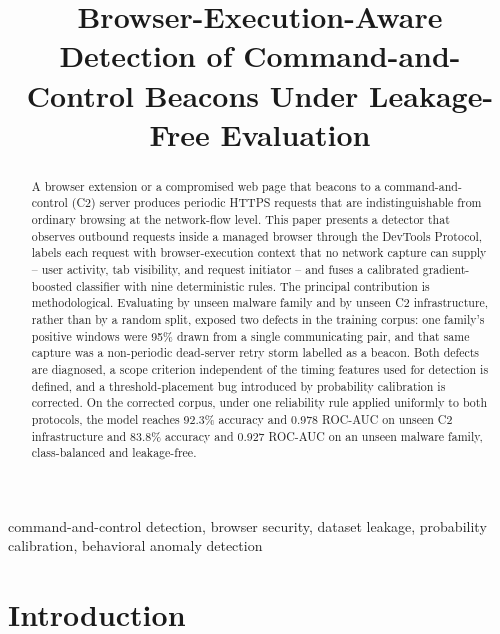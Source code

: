 \documentclass[conference,a4paper]{IEEEtran}
\begin{document}
\title{Browser-Execution-Aware Detection of Command-and-Control Beacons Under Leakage-Free Evaluation}

\author{
}

\maketitle

\begin{abstract}
A browser extension or a compromised web page that beacons to a command-and-control (C2) server produces periodic HTTPS requests that are indistinguishable from ordinary browsing at the network-flow level. This paper presents a detector that observes outbound requests inside a managed browser through the DevTools Protocol, labels each request with browser-execution context that no network capture can supply -- user activity, tab visibility, and request initiator -- and fuses a calibrated gradient-boosted classifier with nine deterministic rules. The principal contribution is methodological. Evaluating by unseen malware family and by unseen C2 infrastructure, rather than by a random split, exposed two defects in the training corpus: one family's positive windows were 95\% drawn from a single communicating pair, and that same capture was a non-periodic dead-server retry storm labelled as a beacon. Both defects are diagnosed, a scope criterion independent of the timing features used for detection is defined, and a threshold-placement bug introduced by probability calibration is corrected. On the corrected corpus, under one reliability rule applied uniformly to both protocols, the model reaches 92.3\% accuracy and 0.978 ROC-AUC on unseen C2 infrastructure and 83.8\% accuracy and 0.927 ROC-AUC on an unseen malware family, class-balanced and leakage-free.
\end{abstract}

\begin{IEEEkeywords}
command-and-control detection, browser security, dataset leakage, probability calibration, behavioral anomaly detection
\end{IEEEkeywords}

\section{Introduction}\label{sec:intro}
\end{document}
